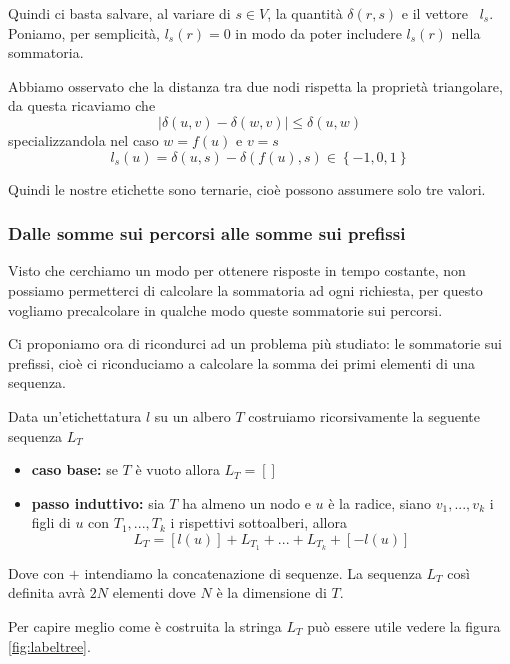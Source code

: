 \documentclass[a4paper,10pt]{amsbook}
\theoremstyle{plain}
\theoremstyle{definition}
\theoremstyle{remark}
\newcommand{\set}[1]{\left\{#1\right\}}
\newcommand{\pa}[1]{\left(#1\right)}
\newcommand{\bra}[1]{\left[#1\right]}
\newcommand{\abs}[1]{\left|#1\right|}
\begin{document}
Quindi ci basta salvare, al variare di $s\in V$, la quantit\`a
$\delta\pa{ r,s}$ e il vettore~ $l_s$. Poniamo, per semplicit\`a,
$l_s(r) = 0$ in modo da poter includere $l_s(r)$ nella sommatoria.

Abbiamo osservato che la distanza tra due nodi rispetta la propriet\`a
triangolare, da questa ricaviamo che 
\[ \abs { \delta\pa{ u,v} - \delta\pa{ w,v}} \le \delta\pa{ u,w} \]
specializzandola nel caso $w = f(u)$ e $v = s$
\[ l_s (u) = \delta\pa{ u,s} - \delta\pa{ f(u),s} \in \set{ -1, 0 ,
  1} \]

Quindi le nostre etichette sono ternarie, cio\`e possono assumere solo
tre valori.

\subsubsection{Dalle somme sui percorsi alle somme sui prefissi}

Visto che cerchiamo un modo per ottenere risposte in tempo costante,
non possiamo permetterci di calcolare la sommatoria ad ogni richiesta,
per questo vogliamo precalcolare in qualche modo queste sommatorie sui
percorsi.

Ci proponiamo ora di ricondurci ad un problema pi\`u studiato: le
sommatorie sui prefissi, cio\`e ci riconduciamo a calcolare la somma
dei primi elementi di una sequenza.

Data un'etichettatura $l$ su un albero $T$ costruiamo ricorsivamente
la seguente sequenza $L_T$
\begin{itemize}
\item \textbf{caso base:} se $T$ \`e vuoto allora $L_T = \bra{}$
\item \textbf{passo induttivo:} sia $T$ ha almeno un nodo e $u$ \`e la
  radice, siano $v_1,... ,v_k$ i figli di $u$ con $T_1,...,T_k$ i
  rispettivi sottoalberi, allora
  \[ L_T = \bra{ l(u) } + L_{T_1} + ... + L_{T_k} + \bra{ -l(u) } \]
\end{itemize}
Dove con $+$ intendiamo la concatenazione di sequenze. La sequenza
$L_T$ cos\`i definita avr\`a $2N$ elementi dove $N$ \`e la dimensione
di $T$.

Per capire meglio come \`e costruita la stringa $L_T$ pu\`o essere
utile vedere la figura~ \ref{fig:labeltree}.
\end{document}
